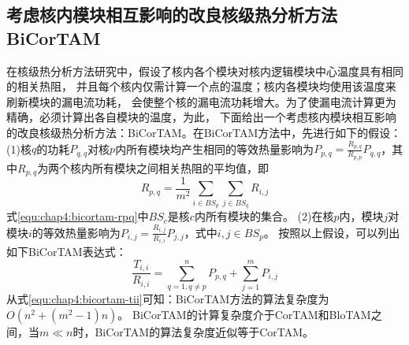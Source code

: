 \subsection{考虑核内模块相互影响的改良核级热分析方法BiCorTAM}
在核级热分析方法研究中，假设了核内各个模块对核内逻辑模块中心温度具有相同的相关热阻， 并且每个核内仅需计算一个点的温度；核内各模块均使用该温度来刷新模块的漏电流功耗， 会使整个核的漏电流功耗增大。为了使漏电流计算更为精确，必须计算出各自模块的温度，为此， 下面给出一个考虑核内模块相互影响的改良核级热分析方法：BiCorTAM。在BiCorTAM方法中，先进行如下的假设：
(1)核$q$的功耗$P_{q,q}$对核$p$内所有模块均产生相同的等效热量影响为$P_{p,q} = \frac{R_{p,q}}{R_{p,p}}P_{q,q}$，其中$R_{p,q}$为两个核内所有模块之间相关热阻的平均值，即
\begin{equation}
\label{equ:chap4:bicortam-rpq}
R_{p,q} = \frac{1}{m^2}\sum\limits_{i \in BS_p}\sum\limits_{j \in BS_q}R_{i,j}
\end{equation}
式\ref{equ:chap4:bicortam-rpq}中$BS_c$是核$c$内所有模块的集合。
(2)在核$p$内，模块$j$对模块$i$的等效热量影响为$P_{i,j} = \frac{R_{i,j}}{R_{i,i}}P_{j,j}$，式中$i,j \in BS_p$。
按照以上假设，可以列出如下BiCorTAM表达式：
\begin{equation}
\label{equ:chap4:bicortam-tii}
\frac{T_{i,i}}{R_{i,i}} = \sum\limits_{q=1,q\neq p}^n P_{p,q} + \sum\limits_{j=1}^m P_{i,j}
\end{equation}
从式\ref{equ:chap4:bicortam-tii}可知：BiCorTAM方法的算法复杂度为$O(n^2+(m^2-1)n)$。 BiCorTAM的计算复杂度介于CorTAM和BloTAM之间，当$m \ll n$时，BiCorTAM的算法复杂度近似等于CorTAM。

